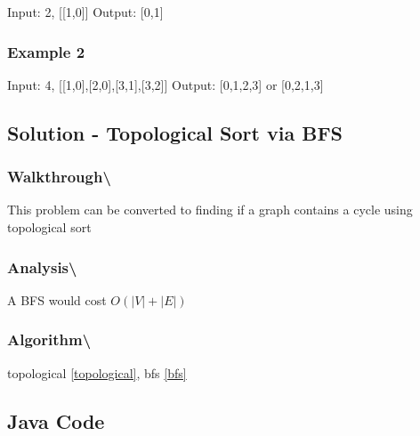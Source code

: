 \documentclass[]{book}
\begin{document}
Input: 2, {[}{[}1,0{]}{]}
Output: {[}0,1{]}

\hypertarget{example-2-2}{%
\subsubsection{Example 2}\label{example-2-2}}

Input: 4, {[}{[}1,0{]},{[}2,0{]},{[}3,1{]},{[}3,2{]}{]}
Output: {[}0,1,2,3{]} or {[}0,2,1,3{]}

\hypertarget{solution---topological-sort-via-bfs-1}{%
\subsection{Solution - Topological Sort via BFS}\label{solution---topological-sort-via-bfs-1}}

\hypertarget{walkthrough-97}{%
\subsubsection{Walkthrough\textbackslash{}}\label{walkthrough-97}}

This problem can be converted to finding if a graph contains a cycle using topological sort

\hypertarget{analysis-104}{%
\subsubsection{Analysis\textbackslash{}}\label{analysis-104}}

A BFS would cost \(O(|V| + |E|)\)

\hypertarget{algorithm-110}{%
\subsubsection{Algorithm\textbackslash{}}\label{algorithm-110}}

topological \ref{topological}, bfs \ref{bfs}

\hypertarget{java-code-65}{%
\subsection{Java Code}\label{java-code-65}}
\end{document}
